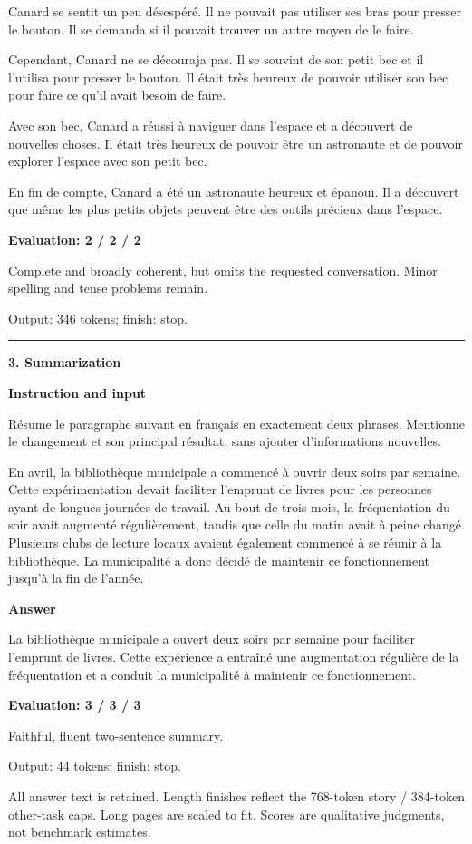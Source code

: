 \documentclass[10pt]{article}
\begin{document}
{\begin{minipage}{\textwidth}
\par\smallskip
Canard se sentit un peu désespéré. Il ne pouvait pas utiliser ses bras pour presser le bouton. Il se demanda si il pouvait trouver un autre moyen de le faire.
\par\smallskip
Cependant, Canard ne se découraja pas. Il se souvint de son petit bec et il l'utilisa pour presser le bouton. Il était très heureux de pouvoir utiliser son bec pour faire ce qu'il avait besoin de faire.
\par\smallskip
Avec son bec, Canard a réussi à naviguer dans l'espace et a découvert de nouvelles choses. Il était très heureux de pouvoir être un astronaute et de pouvoir explorer l'espace avec son petit bec.
\par\smallskip
En fin de compte, Canard a été un astronaute heureux et épanoui. Il a découvert que même les plus petits objets peuvent être des outils précieux dans l'espace.\par\smallskip
\textbf{Evaluation: 2 / 2 / 2}\par Complete and broadly coherent, but omits the requested conversation. Minor spelling and tense problems remain.
\par {\color{gray} Output: 346 tokens; finish: stop.}\par
\medskip\hrule\smallskip
{\bfseries 3. Summarization}\par\smallskip
\textbf{Instruction and input}\par Résume le paragraphe suivant en français en exactement deux phrases. Mentionne le changement et son principal résultat, sans ajouter d'informations nouvelles.
\par\smallskip
En avril, la bibliothèque municipale a commencé à ouvrir deux soirs par semaine. Cette expérimentation devait faciliter l'emprunt de livres pour les personnes ayant de longues journées de travail. Au bout de trois mois, la fréquentation du soir avait augmenté régulièrement, tandis que celle du matin avait à peine changé. Plusieurs clubs de lecture locaux avaient également commencé à se réunir à la bibliothèque. La municipalité a donc décidé de maintenir ce fonctionnement jusqu'à la fin de l'année.\par\smallskip
\textbf{Answer}\par La bibliothèque municipale a ouvert deux soirs par semaine pour faciliter l'emprunt de livres. Cette expérience a entraîné une augmentation régulière de la fréquentation et a conduit la municipalité à maintenir ce fonctionnement.\par\smallskip
\textbf{Evaluation: 3 / 3 / 3}\par Faithful, fluent two-sentence summary.
\par {\color{gray} Output: 44 tokens; finish: stop.}\par
\medskip\footnotesize All answer text is retained. Length finishes reflect the 768-token story / 384-token other-task caps. Long pages are scaled to fit. Scores are qualitative judgments, not benchmark estimates.
\end{minipage}}%
\end{document}
